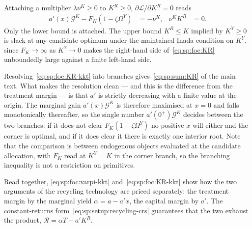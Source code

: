 Attaching a multiplier $\lambda\nu^K\ge0$ to $K^R\ge0$,
$\partial\mathcal L/\partial K^R=0$ reads
\begin{align}
a'\!\left(x\right)\mathcal G^K-F_K\left(1-\zeta\Omega^Y\right) &= -\nu^K,
&
\nu^KK^R &= 0 .
\label{eq:sp:foc:KR-kkt}
\end{align}
Only the lower bound is attached. The upper bound $K^R\le K$ implied by $K^Y\ge0$ is
slack at any candidate optimum under the maintained Inada condition on $K^Y$, since $F_K\to\infty$ as
$K^Y\to0$ makes the right-hand side of~\eqref{eq:sp:foc:KR} unboundedly large against a finite left-hand
side.

Resolving~\eqref{eq:sp:foc:KR-kkt} into branches gives~\eqref{eq:sp:sum:KR} of the main text. What
makes the resolution clean --- and this is the difference from the treatment margin --- is that
$a'$ is strictly decreasing with a finite value at the origin. The marginal gain
$a'\!\left(x\right)\mathcal G^K$ is therefore maximised at $x=0$ and falls monotonically thereafter,
so the single number $a'\!\left(0^+\right)\mathcal G^K$ decides between the two branches: if it does
not clear $F_K\left(1-\zeta\Omega^Y\right)$ no positive $x$ will either and the corner is optimal,
and if it does clear it there is exactly one interior root. Note that the comparison is between
endogenous objects evaluated at the candidate allocation, with $F_K$ read at $K^Y=K$ in the corner
branch, so the branching inequality is not a restriction on primitives.

Read together, \eqref{eq:sp:foc:varpi-kkt} and~\eqref{eq:sp:foc:KR-kkt} show how the two arguments of the recycling technology are priced separately: the treatment margin by the marginal yield $\alpha=a-a'x$, the capital margin by $a'$. The constant-returns form~\eqref{eq:sp:setup:recycling-crs} guarantees that the two exhaust the product, $\mathcal R=\alpha T+a'K^R$.

